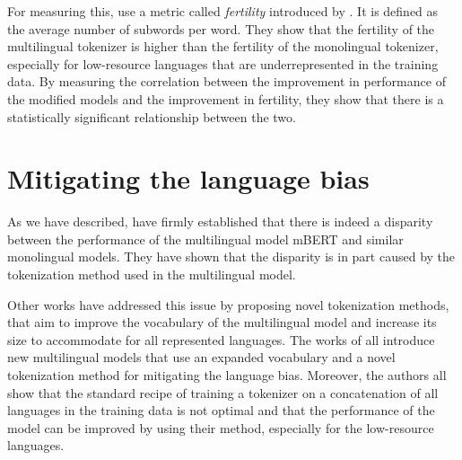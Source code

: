 For measuring this, \citet{rust_how_2021} use a metric called \textit{fertility} introduced by \citet{acs_exploring_2019}. It is defined as the average number of subwords per word. They show that the fertility of the multilingual tokenizer is higher than the fertility of the monolingual tokenizer, especially for low-resource languages that are underrepresented in the training data. By measuring the correlation between the improvement in performance of the modified models and the improvement in fertility, they show that there is a statistically significant relationship between the two.


\section{Mitigating the language bias}

As we have described, \citet{rust_how_2021} have firmly established that there is indeed a disparity between the performance of the multilingual model mBERT and similar monolingual models. They have shown that the disparity is in part caused by the tokenization method used in the multilingual model.

Other works have addressed this issue by proposing novel tokenization methods, that aim to improve the vocabulary of the multilingual model and increase its size to accommodate for all represented languages. The works of \citet{chung_improving_2020,zheng_allocating_2021,liang_xlm-v_2023} all introduce new multilingual models that use an expanded vocabulary and a novel tokenization method for mitigating the language bias. Moreover, the authors all show that the standard recipe of training a tokenizer on a concatenation of all languages in the training data is not optimal and that the performance of the model can be improved by using their method, especially for the low-resource languages.

